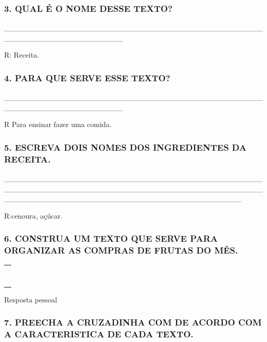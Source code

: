 \subsubsection{3. QUAL É O NOME DESSE
TEXTO?}\label{qual-uxe9-o-nome-desse-texto}

\_\_\_\_\_\_\_\_\_\_\_\_\_\_\_\_\_\_\_\_\_\_\_\_\_\_\_\_\_\_\_\_\_\_\_\_\_\_\_\_\_\_\_\_\_\_\_\_\_\_\_\_\_\_\_\_\_\_\_\_\_\_\_\_\_\_\_\_\_\_

R: Receita.\protect\hypertarget{_heading=h.sb19dr2f5edy}{}{}

\subsubsection{4. PARA QUE SERVE ESSE
TEXTO?}\label{para-que-serve-esse-texto}

\_\_\_\_\_\_\_\_\_\_\_\_\_\_\_\_\_\_\_\_\_\_\_\_\_\_\_\_\_\_\_\_\_\_\_\_\_\_\_\_\_\_\_\_\_\_\_\_\_\_\_\_\_\_\_\_\_\_\_\_\_\_\_\_\_\_\_\_\_\_

R Para ensinar fazer uma comida.

\subsubsection{5. ESCREVA DOIS NOMES DOS INGREDIENTES DA
RECEITA.}\label{escreva-dois-nomes-dos-ingredientes-da-receita.}

\_\_\_\_\_\_\_\_\_\_\_\_\_\_\_\_\_\_\_\_\_\_\_\_\_\_\_\_\_\_\_\_\_\_\_\_\_\_\_\_\_\_\_\_\_\_\_\_\_\_\_\_\_\_\_\_\_\_\_\_\_\_\_\_\_\_\_\_\_\_\_\_\_\_\_\_\_\_\_\_\_\_\_\_\_\_\_\_\_\_\_\_\_\_\_\_\_\_\_\_\_\_\_\_\_\_\_\_\_\_\_\_\_\_\_\_\_\_\_\_\_\_\_\_\_\_\_\_\_\_\_\_\_\_\_\_\_\_\_\_

R:cenoura, açúcar.

\subsubsection{6. CONSTRUA UM TEXTO QUE SERVE PARA ORGANIZAR AS COMPRAS
DE FRUTAS DO MÊS.
}\label{construa-um-texto-que-serve-para-organizar-as-compras-de-frutas-do-muxeas.}

\begin{longtable}[]{@{}l@{}}
\toprule
\tabularnewline
\tabularnewline
\tabularnewline
\tabularnewline
\tabularnewline
\tabularnewline
\tabularnewline
\tabularnewline
\bottomrule
\end{longtable}

Resposta pessoal

\subsubsection{7. PREECHA A CRUZADINHA COM DE ACORDO COM A
CARACTERISTICA DE CADA
TEXTO.}\label{preecha-a-cruzadinha-com-de-acordo-com-a-caracteristica-de-cada-texto.}

